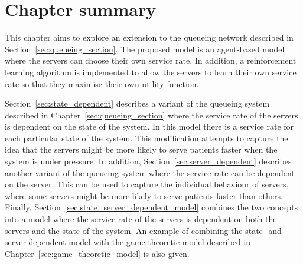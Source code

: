 










\section{Chapter summary}

This chapter aims to explore an extension to the queueing network described in
Section~\ref{sec:queueing_section}.
The proposed model is an agent-based model where the servers can choose their
own service rate.
In addition, a reinforcement learning algorithm is implemented to allow the
servers to learn their own service rate so that they maximise their own utility
function.

Section~\ref{sec:state_dependent} describes a variant of the queueing system
described in Chapter~\ref{sec:queueing_section} where the service rate of the
servers is dependent on the state of the system.
In this model there is a service rate for each particular state of the system.
This modification attempts to capture the idea that the servers might be more
likely to serve patients faster when the system is under pressure.
In addition, Section~\ref{sec:server_dependent} describes another variant of
the queueing system where the service rate can be dependent on the server.
This can be used to capture the individual behaviour of servers, where some
servers might be more likely to serve patients faster than others.
Finally, Section~\ref{sec:state_server_dependent_model} combines the two
concepts into a model where the service rate of the servers is dependent on
both the servers and the state of the system.
An example of combining the state- and server-dependent model with the game
theoretic model described in Chapter~\ref{sec:game_theoretic_model} is also
given.

